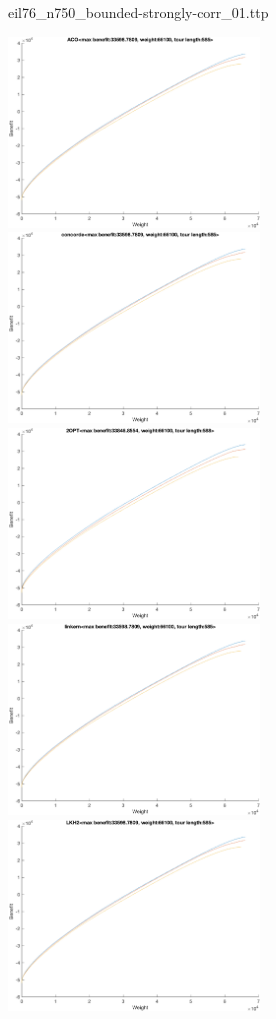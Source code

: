 \documentclass{article}
\begin{document}
\newpage
eil76\_n750\_bounded-strongly-corr\_01.ttp

\noindent
\includegraphics[width=0.5\textwidth]{eil76figs/eil76_n750_bounded-strongly-corr_01.ttp.aco.txt.atsf.eps}
\includegraphics[width=0.5\textwidth]{eil76figs/eil76_n750_bounded-strongly-corr_01.ttp.con.txt.atsf.eps}
\includegraphics[width=0.5\textwidth]{eil76figs/eil76_n750_bounded-strongly-corr_01.ttp.inv.txt.atsf.eps}
\includegraphics[width=0.5\textwidth]{eil76figs/eil76_n750_bounded-strongly-corr_01.ttp.lkh.txt.atsf.eps}
\includegraphics[width=0.5\textwidth]{eil76figs/eil76_n750_bounded-strongly-corr_01.ttp.lkh2.txt.atsf.eps}
\end{document}
